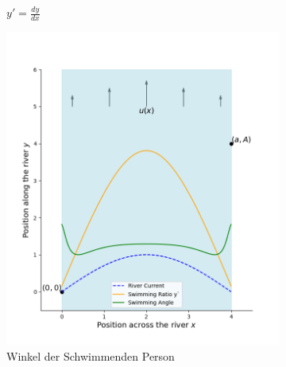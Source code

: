 \begin{figure}
\begin{subfigure}{0.48\textwidth}
        \caption{\(y' = \frac{dy}{dx}\)}
        \label{fig:diagonal_velocity}
    \end{subfigure}
    \par\bigskip
    \begin{subfigure}{0.48\textwidth}
        \centering
        \includegraphics[width=\textwidth]{papers/schwimmen/Grafiken/Figure_4.png}	
        \caption{Winkel der Schwimmenden Person}
        \label{fig:squerd_velocity}
    \end{subfigure}
    \hfill  
    \begin{subfigure}{0.48\textwidth}
        \centering

\end{subfigure}
\end{figure}
